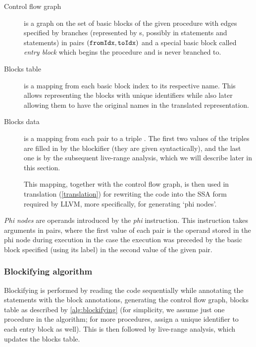 \begin{description}
    \item[Control flow graph] is a graph on the set of basic blocks of the given procedure with edges specified by branches (represented by s, possibly in  statements and  statements) in pairs $(\mathtt{fromIdx}, \mathtt{toIdx})$ and a special basic block called \emph{entry block} which begins the procedure and is never branched to.

    \item[Blocks table] is a mapping from each basic block index to its respective name. This allows representing the blocks with unique identifiers while also later allowing them to have the original names in the translated representation.

    \item[Blocks data] is a mapping from each pair  to a triple . The first two values of the triples are filled in by the blockifier (they are given syntactically), and the last one is by the subsequent live-range analysis, which we will describe later in this section.

    This mapping, together with the control flow graph, is then used in translation (\cref{translation}) for rewriting the code into the SSA form required by LLVM, more specifically, for generating `phi nodes'.
\end{description}

\emph{Phi nodes} are operands introduced by the \emph{phi} instruction. This instruction takes arguments in  pairs, where the first value of each pair is the operand stored in the phi node during execution in the case the execution was preceded by the basic block specified (using its label) in the second value of the given pair.

\subsubsection{Blockifying algorithm}

Blockifying is performed by reading the code sequentially while annotating the statements with the block annotations, generating the control flow graph, blocks table as described by \cref{alg:blockifying} (for simplicity, we assume just one procedure in the algorithm; for more procedures, assign a unique identifier to each entry block as well). This is then followed by live-range analysis, which updates the blocks table.

